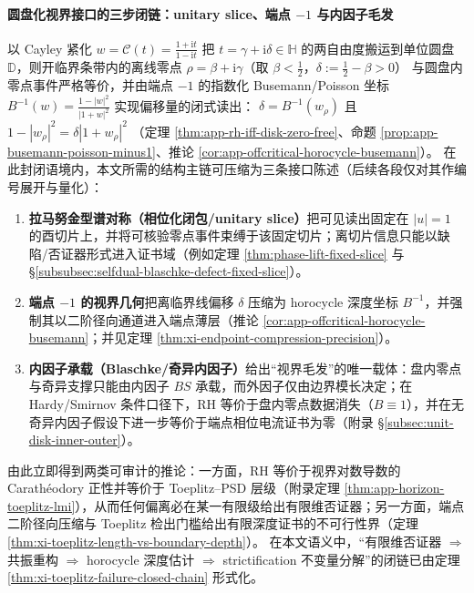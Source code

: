\paragraph{圆盘化视界接口的三步闭链：unitary slice、端点 \texorpdfstring{$-1$}{-1} 与内因子毛发}
以 Cayley 紧化
\(
w=\mathcal{C}(t)=\frac{1+\mathrm{i}t}{1-\mathrm{i}t}
\)
把 \(t=\gamma+\mathrm{i}\delta\in\mathbb{H}\) 的两自由度搬运到单位圆盘 \(\mathbb{D}\)，则开临界条带内的离线零点
\(\rho=\beta+\mathrm{i}\gamma\)（取 \(\beta<\tfrac12\)，\(\delta:=\tfrac12-\beta>0\)）
与圆盘内零点事件严格等价，并由端点 \(-1\) 的指数化 Busemann/Poisson 坐标
\(B^{-1}(w)=\frac{1-|w|^{2}}{|1+w|^{2}}\) 实现偏移量的闭式读出：
\(
\delta=B^{-1}(w_\rho)
\)
且
\(
1-|w_\rho|^{2}=\delta|1+w_\rho|^{2}
\)
（定理 \ref{thm:app-rh-iff-disk-zero-free}、命题 \ref{prop:app-busemann-poisson-minus1}、推论 \ref{cor:app-offcritical-horocycle-busemann}）。
在此封闭语境内，本文所需的结构主链可压缩为三条接口陈述（后续各段仅对其作编号展开与量化）：
{\renewcommand{\labelenumi}{(\roman{enumi})}
\begin{enumerate}
  \item \textbf{拉马努金型谱对称（相位化闭包/unitary slice）}把可见读出固定在 \(|u|=1\) 的酉切片上，并将可核验零点事件束缚于该固定切片；离切片信息只能以缺陷/否证器形式进入证书域（例如定理 \ref{thm:phase-lift-fixed-slice} 与 \S\ref{subsubsec:selfdual-blaschke-defect-fixed-slice}）。
  \item \textbf{端点 \texorpdfstring{$-1$}{-1} 的视界几何}把离临界线偏移 \(\delta\) 压缩为 horocycle 深度坐标 \(B^{-1}\)，并强制其以二阶径向通道进入端点薄层（推论 \ref{cor:app-offcritical-horocycle-busemann}；并见定理 \ref{thm:xi-endpoint-compression-precision}）。
  \item \textbf{内因子承载（Blaschke/奇异内因子）}给出“视界毛发”的唯一载体：盘内零点与奇异支撑只能由内因子 \(BS\) 承载，而外因子仅由边界模长决定；在 Hardy/Smirnov 条件口径下，RH 等价于盘内零点数据消失（\(B\equiv 1\)），并在无奇异内因子假设下进一步等价于端点相位电流证书为零（附录 \S\ref{subsec:unit-disk-inner-outer}）。
\end{enumerate}}
由此立即得到两类可审计的推论：一方面，RH 等价于视界对数导数的 Carath\'eodory 正性并等价于 Toeplitz--PSD 层级（附录定理 \ref{thm:app-horizon-toeplitz-lmi}），从而任何偏离必在某一有限级给出有限维否证器；另一方面，端点二阶径向压缩与 Toeplitz 检出门槛给出有限深度证书的不可行性界（定理 \ref{thm:xi-toeplitz-length-vs-boundary-depth}）。
在本文语义中，“有限维否证器 \(\Rightarrow\) 共振重构 \(\Rightarrow\) horocycle 深度估计 \(\Rightarrow\) strictification 不变量分解”的闭链已由定理 \ref{thm:xi-toeplitz-failure-closed-chain} 形式化。

